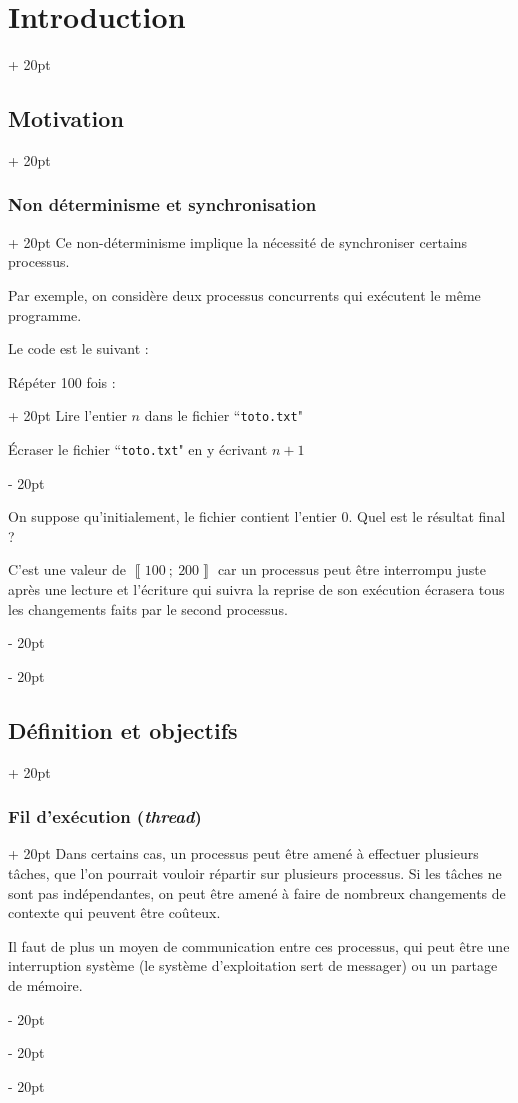 \documentclass[a4paper, 12pt, twoside]{article}
\newcommand{\nset}[2]{\left\llbracket #1\ ;\ #2 \right\rrbracket}
\newcommand{\ind}[1][20pt]{\advance\leftskip + #1}
\newcommand{\deind}[1][20pt]{\advance\leftskip - #1}
\newenvironment{indt}[2][20pt]{#2 \par \ind[#1]}{\par \deind} %
\begin{document}
\begin{indt}{\section{Introduction}}
\begin{indt}{\subsection{Motivation}}
\begin{indt}{\subsubsection{Non déterminisme et synchronisation}}
                Ce non-déterminisme implique la nécessité de synchroniser certains processus.

                \vspace{6pt}
                
                Par exemple, on considère deux processus concurrents qui exécutent le même programme.

                Le code est le suivant :

                \begin{emphBox}
                    \begin{indt}{Répéter 100 fois :}
                        Lire l'entier $n$ dans le fichier ``\texttt{toto.txt}"

                        Écraser le fichier ``\texttt{toto.txt}" en y écrivant $n + 1$
                    \end{indt}
                \end{emphBox}

                On suppose qu'initialement, le fichier contient l'entier $0$.
                Quel est le résultat final ?

                C'est une valeur de $\nset{100}{200}$ car un processus peut être interrompu juste après une lecture et l'écriture qui suivra la reprise de son exécution écrasera tous les changements faits par le second processus.
            \end{indt}
        \end{indt}

        \vspace{12pt}
        
        \begin{indt}{\subsection{Définition et objectifs}}
            \begin{indt}{\subsubsection{Fil d'exécution (\textit{thread})}}
                Dans certains cas, un processus peut être amené à effectuer plusieurs tâches, que l'on pourrait vouloir répartir sur plusieurs processus.
                Si les tâches ne sont pas indépendantes, on peut être amené à faire de nombreux changements de contexte qui peuvent être coûteux.

                Il faut de plus un moyen de communication entre ces processus, qui peut être une interruption système (le système d'exploitation sert de messager) ou un partage de mémoire.


\end{indt}
\end{indt}
\end{indt}
\end{document}

